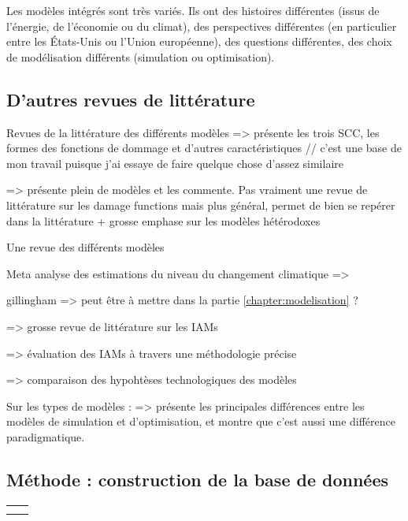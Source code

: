 Les modèles intégrés sont très variés. Ils ont des histoires différentes (issus de l'énergie, de l'économie ou du climat), des perspectives différentes (en particulier entre les États-Unis ou l'Union européenne), des questions différentes, des choix de modélisation différents (simulation ou optimisation). 

\subsection{D'autres revues de littérature}

Revues de la littérature des différents modèles
\cite{diaz_quantifying_2017} => présente les trois SCC, les formes des fonctions de dommage et d'autres caractéristiques // c'est une base de mon travail puisque j'ai essaye de faire quelque chose d'assez similaire

\cite{souffron_successful_2024} => présente plein de modèles et les commente. Pas vraiment une revue de littérature sur les damage functions mais plus général, permet de bien se repérer dans la littérature + grosse emphase sur les modèles hétérodoxes

\cite{review of information on models}  Une revue des différents modèles 

Meta analyse des estimations du niveau du changement climatique
\cite{howard_few_2017} => 

\cite{gillingham_modeling_2018} gillingham => peut être à mettre dans la partie \ref{chapter:modelisation} ?

\cite{keppo_exploring_2021} => grosse revue de littérature sur les IAMs

\cite{harmsen_integrated_2021} => évaluation des IAMs à travers une méthodologie précise

\cite{krey_looking_2019} => comparaison des hypohtèses technologiques des modèles


Sur les types de modèles : 
\cite{mercure_modelling_2019} => présente les principales différences entre les modèles de simulation et d'optimisation, et montre que c'est aussi une différence paradigmatique. 
\subsection{Méthode : construction de la base de données}

\begin{table}[]
    \centering
    \begin{tabular}{c|c}
         &  \\
         & 
    \end{tabular}
    \label{tab:my_label}
\end{table}


